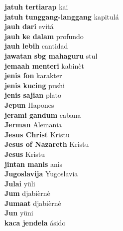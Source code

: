\textbf{ jatuh tertiarap  } kai \\
\textbf{ jatuh tunggang-langgang  } kapitulá \\
\textbf{ jauh dari  } evitá \\
\textbf{ jauh ke dalam  } profundo \\
\textbf{ jauh lebih  } cantidad \\
\textbf{ jawatan sbg mahaguru  } stul \\
\textbf{ jemaah menteri  } kabinèt \\
\textbf{ jenis fon  } karakter \\
\textbf{ jenis kucing  } pushi \\
\textbf{ jenis sajian  } plato \\
\textbf{ Jepun  } Hapones \\
\textbf{ jerami gandum  } cabana \\
\textbf{ Jerman  } Alemania \\
\textbf{ Jesus Christ  } Kristu \\
\textbf{ Jesus of Nazareth  } Kristu \\
\textbf{ Jesus  } Kristu \\
\textbf{ jintan manis  } anis \\
\textbf{ Jugoslavija  } Yugoslavia \\
\textbf{ Julai  } yüli \\
\textbf{ Jum  } djabièrnè \\
\textbf{ Jumaat  } djabièrnè \\
\textbf{ Jun  } yüni \\
\textbf{ kaca jendela  } ásido \\
